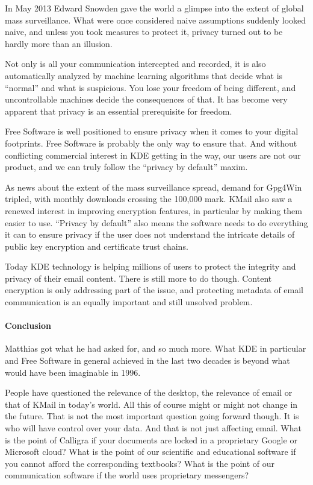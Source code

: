 In May 2013 Edward Snowden gave the world a glimpse into the extent of global mass surveillance. What were once considered naive assumptions suddenly looked naive, and unless you took measures to protect it, privacy turned out to be hardly more than an illusion.

Not only is all your communication intercepted and recorded, it is also automatically analyzed by machine learning algorithms that decide what is “normal” and what is suspicious. You lose your freedom of being different, and uncontrollable machines decide the consequences of that. It has become very apparent that privacy is an essential prerequisite for freedom.

Free Software is well positioned to ensure privacy when it comes to your digital footprints. Free Software is probably the only way to ensure that. And without conflicting commercial interest in KDE getting in the way, our users are not our product, and we can truly follow the “privacy by default” maxim.

As news about the extent of the mass surveillance spread, demand for Gpg4Win tripled, with monthly downloads crossing the 100,000 mark. KMail also saw a renewed interest in improving encryption features, in particular by making them easier to use. “Privacy by default” also means the software needs to do everything it can to ensure privacy if the user does not understand the intricate details of public key encryption and certificate trust chains.

Today KDE technology is helping millions of users to protect the integrity and privacy of their email content. There is still more to do though. Content encryption is only addressing part of the issue, and protecting metadata of email communication is an equally important and still unsolved problem.

\paragraph{Conclusion}

Matthias got what he had asked for, and so much more. What KDE in particular and Free Software in general achieved in the last two decades is beyond what would have been imaginable in 1996.

People have questioned the relevance of the desktop, the relevance of email or that of KMail in today's world. All this of course might or might not change in the future. That is not the most important question going forward though. It is who will have control over your data. And that is not just affecting email. What is the point of Calligra if your documents are locked in a proprietary Google or Microsoft cloud? What is the point of our scientific and educational software if you cannot afford the corresponding textbooks? What is the point of our communication software if the world uses proprietary messengers?

